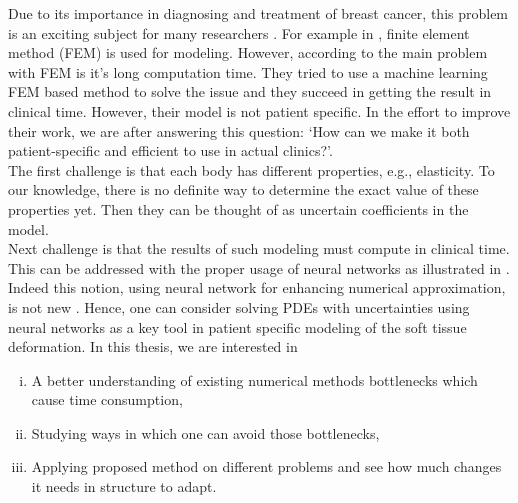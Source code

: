 Due to its importance in diagnosing and treatment of breast cancer, this problem is an exciting subject for many researchers \cite{khatam2015vivo, tanner2002comparison, han2011development, azar2002methods, azar2001deformable, del2008finite, martinez2017finite}. For example in \cite{del2008finite, martinez2017finite, azar2001deformable}, finite element method (FEM) is used for modeling. However, according to \cite{martinez2017finite} the main problem with  FEM is it's long computation time. They tried to use a machine learning FEM based method to solve the issue and they succeed in getting the result in clinical time. However, their model is not patient specific. In the effort to improve their work, we are after answering this question: `How can we make it both patient-specific and efficient to use in actual clinics?'.\\
The first challenge is that each body has different properties, e.g., elasticity. To our knowledge, there is no definite way to determine the exact value of these properties yet. Then they can be thought of as uncertain coefficients in the model.\\
Next challenge is that the results of such modeling must compute in clinical time. This can be addressed with the proper usage of neural networks as illustrated in \cite{martinez2017finite}. Indeed this notion, using neural network for enhancing numerical approximation, is not new \cite{geneva2020modeling, smaoui2004modelling, lagaris2000neural, beck2019machine, zhang2019quantifying, parisi2003solving}.%
Hence, one can consider solving PDEs with uncertainties using neural networks as a key tool in patient specific modeling of the soft tissue deformation. In this thesis, we are interested in
\begin{enumerate}[i.]
	\item A better understanding of existing numerical methods bottlenecks which cause time consumption,
	\item Studying ways in which one can avoid those bottlenecks,
	\item Applying proposed method on different problems and see how much changes it needs in structure to adapt.
\end{enumerate}
